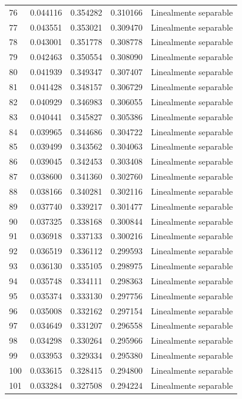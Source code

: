 \begin{tabular}{lllll}
76 & 0.044116 & 0.354282 & 0.310166 & Linealmente separable \\
77 & 0.043551 & 0.353021 & 0.309470 & Linealmente separable \\
78 & 0.043001 & 0.351778 & 0.308778 & Linealmente separable \\
79 & 0.042463 & 0.350554 & 0.308090 & Linealmente separable \\
80 & 0.041939 & 0.349347 & 0.307407 & Linealmente separable \\
81 & 0.041428 & 0.348157 & 0.306729 & Linealmente separable \\
82 & 0.040929 & 0.346983 & 0.306055 & Linealmente separable \\
83 & 0.040441 & 0.345827 & 0.305386 & Linealmente separable \\
84 & 0.039965 & 0.344686 & 0.304722 & Linealmente separable \\
85 & 0.039499 & 0.343562 & 0.304063 & Linealmente separable \\
86 & 0.039045 & 0.342453 & 0.303408 & Linealmente separable \\
87 & 0.038600 & 0.341360 & 0.302760 & Linealmente separable \\
88 & 0.038166 & 0.340281 & 0.302116 & Linealmente separable \\
89 & 0.037740 & 0.339217 & 0.301477 & Linealmente separable \\
90 & 0.037325 & 0.338168 & 0.300844 & Linealmente separable \\
91 & 0.036918 & 0.337133 & 0.300216 & Linealmente separable \\
92 & 0.036519 & 0.336112 & 0.299593 & Linealmente separable \\
93 & 0.036130 & 0.335105 & 0.298975 & Linealmente separable \\
94 & 0.035748 & 0.334111 & 0.298363 & Linealmente separable \\
95 & 0.035374 & 0.333130 & 0.297756 & Linealmente separable \\
96 & 0.035008 & 0.332162 & 0.297154 & Linealmente separable \\
97 & 0.034649 & 0.331207 & 0.296558 & Linealmente separable \\
98 & 0.034298 & 0.330264 & 0.295966 & Linealmente separable \\
99 & 0.033953 & 0.329334 & 0.295380 & Linealmente separable \\
100 & 0.033615 & 0.328415 & 0.294800 & Linealmente separable \\
101 & 0.033284 & 0.327508 & 0.294224 & Linealmente separable \\

\end{tabular}
